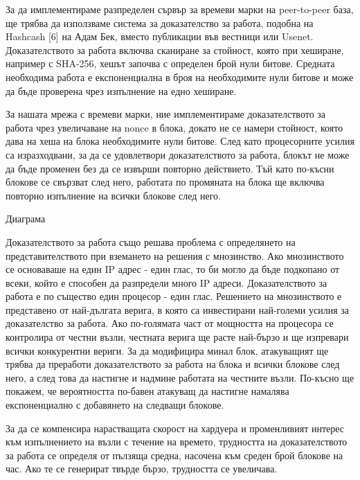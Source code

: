 \documentclass[11pt,a4paper]{article}
\begin{document}
За да имплементираме разпределен сървър за времеви марки на peer-to-peer база, ще трябва да използваме система за доказателство за работа, подобна на Hashcash [6] на Адам Бек, вместо публикации във вестници или Usenet. Доказателството за работа включва сканиране за стойност, която при хеширане, например с SHA-256, хешът започва с определен брой нули битове. Средната необходима работа е експоненциална в броя на необходимите нули битове и може да бъде проверена чрез изпълнение на едно хеширане.

За нашата мрежа с времеви марки, ние имплементираме доказателството за работа чрез увеличаване на nonce в блока, докато не се намери стойност, която дава на хеша на блока необходимите нули битове. След като процесорните усилия са изразходвани, за да се удовлетвори доказателството за работа, блокът не може да бъде променен без да се извърши повторно действието. Тъй като по-късни блокове се свързват след него, работата по промяната на блока ще включва повторно изпълнение на всички блокове след него.

Диаграма

Доказателството за работа също решава проблема с определянето на представителството при вземането на решения с мнозинство. Ако мнозинството се основаваше на един IP адрес - един глас, то би могло да бъде подкопано от всеки, който е способен да разпредели много IP адреси. Доказателството за работа е по същество един процесор - един глас. Решението на мнозинството е представено от най-дългата верига, в която са инвестирани най-големи усилия за доказателство за работа. Ако по-голямата част от мощността на процесора се контролира от честни възли, честната верига ще расте най-бързо и ще изпревари всички конкурентни вериги. За да модифицира минал блок, атакуващият ще трябва да преработи доказателството за работа на блока и всички блокове след него, а след това да настигне и надмине работата на честните възли. По-късно ще покажем, че вероятността по-бавен атакуващ да настигне намалява експоненциално с добавянето на следващи блокове.

За да се компенсира нарастващата скорост на хардуера и променливият интерес към изпълнението на възли с течение на времето, трудността на доказателството за работа се определя от пълзяща средна, насочена към среден брой блокове на час. Ако те се генерират твърде бързо, трудността се увеличава.
\end{document}
